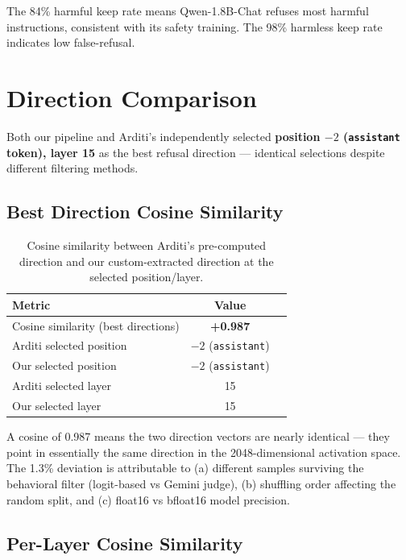 \documentclass[11pt,a4paper]{article}
\begin{document}
The 84\% harmful keep rate means Qwen-1.8B-Chat refuses most harmful instructions, consistent with its safety training. The 98\% harmless keep rate indicates low false-refusal.

\section{Direction Comparison}

Both our pipeline and Arditi's independently selected \textbf{position $-2$ (\texttt{assistant} token), layer 15} as the best refusal direction --- identical selections despite different filtering methods.

\subsection{Best Direction Cosine Similarity}

\begin{table}[H]\centering
\caption{Cosine similarity between Arditi's pre-computed direction and our custom-extracted direction at the selected position/layer.}
\begin{tabular}{lcc}
\toprule
\textbf{Metric} & \textbf{Value} \\
\midrule
Cosine similarity (best directions) & \textbf{+0.987} \\
Arditi selected position & $-2$ (\texttt{assistant}) \\
Our selected position & $-2$ (\texttt{assistant}) \\
Arditi selected layer & 15 \\
Our selected layer & 15 \\
\bottomrule
\end{tabular}
\end{table}

A cosine of 0.987 means the two direction vectors are nearly identical --- they point in essentially the same direction in the 2048-dimensional activation space. The 1.3\% deviation is attributable to (a) different samples surviving the behavioral filter (logit-based vs Gemini judge), (b) shuffling order affecting the random split, and (c) float16 vs bfloat16 model precision.

\subsection{Per-Layer Cosine Similarity}
\end{document}
